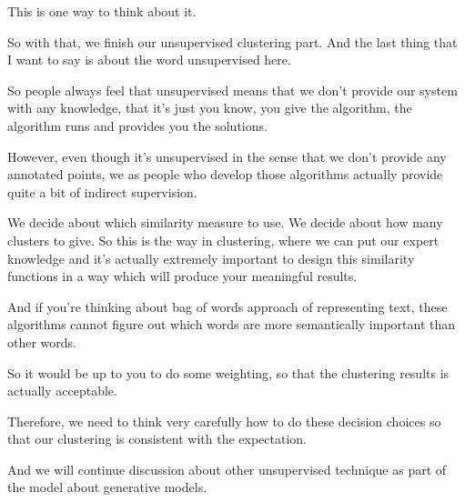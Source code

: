 \documentclass[a4paper, 12pt]{article}
\begin{document}
This is one way to think about it.

So with that, we finish our unsupervised clustering part. And the last thing
that I want to say is about the word unsupervised here.

So people always feel that unsupervised means that we don't provide our system
with any knowledge, that it's just you know, you give the algorithm, the
algorithm runs and provides you the solutions.

However, even though it's unsupervised in the sense that we don't provide any
annotated points, we as people who develop those algorithms actually provide
quite a bit of indirect supervision.

We decide about which similarity measure to use. We decide about how many
clusters to give. So this is the way in clustering, where we can put our expert
knowledge and it's actually extremely important to design this similarity
functions in a way which will produce your meaningful results.

And if you're thinking about bag of words approach of representing text, these
algorithms cannot figure out which words are more semantically important than
other words.

So it would be up to you to do some weighting, so that the clustering results is
actually acceptable.

Therefore, we need to think very carefully how to do these decision choices so
that our clustering is consistent with the expectation.

And we will continue discussion about other unsupervised technique as part of
the model about generative models.
\end{document}
